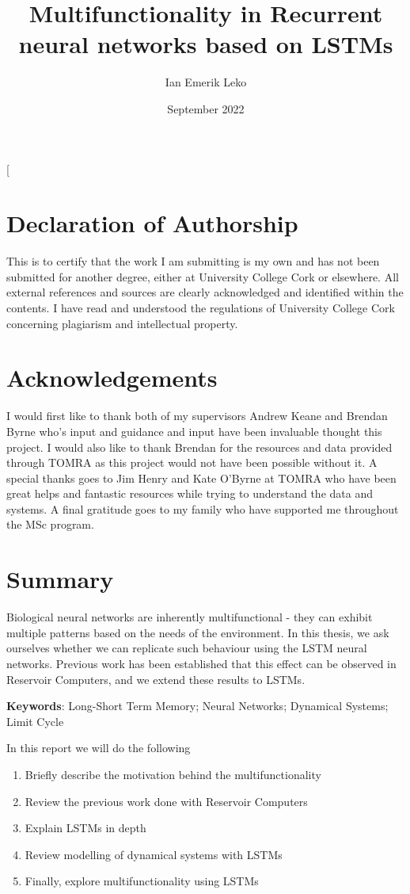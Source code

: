 \documentclass[twocolumn]{article}
\title{Multifunctionality in Recurrent neural networks based on LSTMs}
\author{Ian Emerik Leko}
\date{September 2022}
\theoremstyle{mystyle}
\begin{document}
\lstset{
  basicstyle=\ttfamily,
  columns=fullflexible,
  keepspaces=true,
}


\twocolumn[
  \begin{@twocolumnfalse}
  \maketitle
  
  \vspace{5pt}
  
\section*{Declaration of Authorship} 
This is to certify that the work I am submitting is my own and has not been submitted for another degree, either at University College Cork or elsewhere. All external references and sources are clearly acknowledged and identified within the contents. I have read and understood the regulations of University College Cork concerning plagiarism and intellectual property.

\section*{Acknowledgements}
I would first like to thank both of my supervisors Andrew Keane and Brendan Byrne who's input and guidance and input have been invaluable thought this project. I would also like to thank Brendan for the resources and data provided through TOMRA as this project would not have been possible without it. A special thanks goes to Jim Henry and Kate O'Byrne at TOMRA who have been great helps and fantastic resources while trying to understand the data and systems. A final gratitude goes to my family who have supported me throughout the MSc program.
 
\section*{Summary}

Biological neural networks are inherently multifunctional - they can exhibit multiple patterns based on the needs of the environment. In this thesis, we ask ourselves whether we can replicate such behaviour using the LSTM neural networks. Previous work has been established that this effect can be observed in Reservoir Computers, and we extend these results to LSTMs.

\textbf{Keywords}: Long-Short Term Memory; Neural Networks; Dynamical Systems; Limit Cycle

In this report we will do the following
\begin{enumerate}
    \item Briefly describe the motivation behind the multifunctionality
    \item Review the previous work done with Reservoir Computers
    \item Explain LSTMs in depth
    \item Review modelling of dynamical systems with LSTMs
    \item Finally, explore multifunctionality using LSTMs
\end{enumerate}
  \end{@twocolumnfalse}
\end{document}
